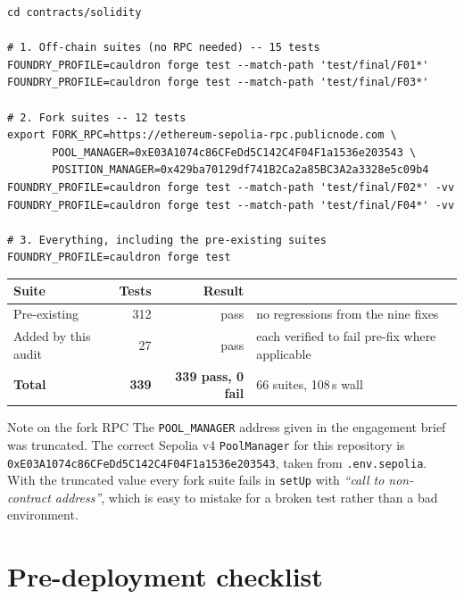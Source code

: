 \documentclass[11pt,a4paper]{article}
\newcommand{\code}[1]{\texttt{\small #1}}
\begin{document}
\begin{lstlisting}
cd contracts/solidity

# 1. Off-chain suites (no RPC needed) -- 15 tests
FOUNDRY_PROFILE=cauldron forge test --match-path 'test/final/F01*'
FOUNDRY_PROFILE=cauldron forge test --match-path 'test/final/F03*'

# 2. Fork suites -- 12 tests
export FORK_RPC=https://ethereum-sepolia-rpc.publicnode.com \
       POOL_MANAGER=0xE03A1074c86CFeDd5C142C4F04F1a1536e203543 \
       POSITION_MANAGER=0x429ba70129df741B2Ca2a85BC3A2a3328e5c09b4
FOUNDRY_PROFILE=cauldron forge test --match-path 'test/final/F02*' -vv
FOUNDRY_PROFILE=cauldron forge test --match-path 'test/final/F04*' -vv

# 3. Everything, including the pre-existing suites
FOUNDRY_PROFILE=cauldron forge test
\end{lstlisting}

\begin{center}\small
\begin{tabular}{@{}lrrl@{}}
\toprule
\textbf{Suite} & \textbf{Tests} & \textbf{Result} & \\
\midrule
Pre-existing & 312 & pass & no regressions from the nine fixes \\
Added by this audit & 27 & pass & each verified to fail pre-fix where applicable \\
\midrule
\textbf{Total} & \textbf{339} & \textbf{339 pass, 0 fail} & 66 suites, 108\,s wall \\
\bottomrule
\end{tabular}
\end{center}

\begin{notebox}{Note on the fork RPC}
The \code{POOL\_MANAGER} address given in the engagement brief was truncated. The
correct Sepolia v4 \code{PoolManager} for this repository is
\code{0xE03A1074c86CFeDd5C142C4F04F1a1536e203543}, taken from
\code{.env.sepolia}. With the truncated value every fork suite fails in
\code{setUp} with \emph{``call to non-contract address''}, which is easy to
mistake for a broken test rather than a bad environment.
\end{notebox}

\newpage
\section{Pre-deployment checklist}
\label{sec:checklist}
\end{document}
